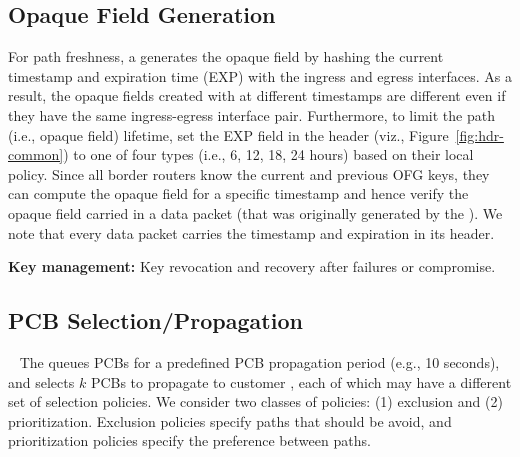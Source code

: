 \subsection{Opaque Field Generation}
For path freshness, a \BS generates the opaque field by hashing the current timestamp and expiration time (EXP) with the ingress and egress interfaces. As a result, the opaque fields created with at different timestamps are different even if they have the same ingress-egress interface pair. Furthermore, to limit the path (i.e., opaque field) lifetime, \BSs set the EXP field in the header (viz., Figure~\ref{fig:hdr-common}) to one of four types (i.e., 6, 12, 18, 24 hours) based on their local policy. Since all border routers know the current and previous OFG keys, they can compute the opaque field for a specific timestamp and hence verify the opaque field carried in a data packet (that was originally generated by the \BS). We note that every data packet carries the timestamp and expiration in its header. %

{\bf Key management:} Key revocation and recovery after failures or compromise. 

\subsection{PCB Selection/Propagation}~\label{subsec:pcb_selection}
The \BS queues PCBs for a predefined PCB propagation period (e.g., 10
seconds), and selects $k$ PCBs to propagate to customer \ADs, each of
which may have a different set of selection policies. We consider two
classes of policies: (1) exclusion and (2) prioritization. Exclusion
policies specify paths that should be avoid, and prioritization
policies specify the preference between paths.

